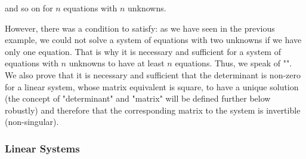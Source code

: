 	and so on for $n$ equations with $n$ unknowns.

	However, there was a condition to satisfy: as we have seen in the previous example, we could not solve a system of equations with two unknowns if we have only one equation. That is why it is necessary and sufficient for a system of equations with $n$ unknowns to have at least $n$ equations. Thus, we speak of "". We also prove that it is necessary and sufficient that the determinant is non-zero for a linear system, whose matrix equivalent is square, to have a unique solution (the concept of "determinant" and "matrix" will be defined further below robustly) and therefore that the corresponding matrix to the system is invertible (non-singular).

\pagebreak
\subsubsection{Linear Systems}\label{linear systems}

